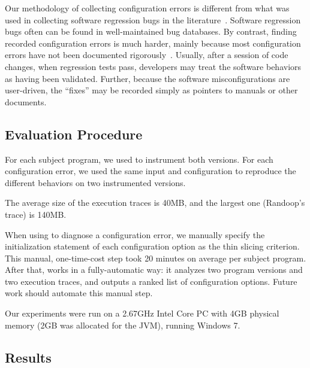 Our methodology of collecting
configuration errors is different from what was used in
collecting software regression bugs in the literature~\cite{dd, autoflow}.
Software regression bugs often can be found in well-maintained
bug databases. By contrast, finding recorded configuration errors
is much harder, mainly because most configuration errors have not been
documented rigorously~\cite{Yin:2011:ESC}. Usually, after a
session of code changes, when regression tests pass, developers
may treat the software behaviors as having been validated. Further,
because the software misconfigurations are user-driven,
the ``fixes'' may be recorded simply as pointers
to manuals or other documents. 






\subsection{Evaluation Procedure}

For each subject program, we used \ourtool to instrument both versions. 
For each configuration error, we used the same 
input and configuration
to reproduce the different behaviors on two instrumented versions.

The average size of the execution traces is 40MB,
and the largest one (Randoop's trace) is 140MB.



When using \ourtool to diagnose a configuration error, we manually specify
the initialization statement of each configuration option as
the thin slicing criterion. This manual, one-time-cost step took 
20 minutes on average per subject program. After that,
\ourtool works in a fully-automatic way: it 
analyzes two program versions and two execution traces,
and outputs a ranked list of configuration options.
Future work should automate this manual step.

Our experiments were run on a 2.67GHz Intel Core PC
with 4GB physical memory (2GB was allocated for the JVM),
running Windows 7.

\subsection{Results}

